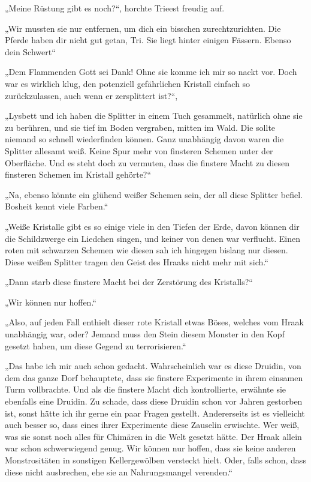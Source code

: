 „Meine Rüstung gibt es noch?“, horchte Trieest freudig auf.

„Wir mussten sie nur entfernen, um dich ein bisschen zurechtzurichten. Die Pferde haben dir nicht gut getan, Tri. Sie liegt hinter einigen Fässern. Ebenso dein Schwert“

„Dem Flammenden Gott sei Dank! Ohne sie komme ich mir so nackt vor. Doch war es wirklich klug, den potenziell gefährlichen Kristall einfach so zurückzulassen, auch wenn er zersplittert ist?“,

„Lysbett und ich haben die Splitter in einem Tuch gesammelt, natürlich ohne sie zu berühren, und sie tief im Boden vergraben, mitten im Wald. Die sollte niemand so schnell wiederfinden können. Ganz unabhängig davon waren die Splitter allesamt weiß. Keine Spur mehr von finsteren Schemen unter der Oberfläche. Und es steht doch zu vermuten, dass die finstere Macht zu diesen finsteren Schemen im Kristall gehörte?“

„Na, ebenso könnte ein glühend weißer Schemen sein, der all diese Splitter befiel. Bosheit kennt viele Farben.“

„Weiße Kristalle gibt es so einige viele in den Tiefen der Erde, davon können dir die Schildzwerge ein Liedchen singen, und keiner von denen war verflucht. Einen roten mit schwarzen Schemen wie diesen sah ich hingegen bislang nur diesen. Diese weißen Splitter tragen den Geist des Hraaks nicht mehr mit sich.“

„Dann starb diese finstere Macht bei der Zerstörung des Kristalls?“

„Wir können nur hoffen.“

„Also, auf jeden Fall enthielt dieser rote Kristall etwas Böses, welches vom Hraak unabhängig war, oder? Jemand muss den Stein diesem Monster in den Kopf gesetzt haben, um diese Gegend zu terrorisieren.“

„Das habe ich mir auch schon gedacht. Wahrscheinlich war es diese Druidin, von dem das ganze Dorf behauptete, dass sie finstere Experimente in ihrem einsamen Turm vollbrachte. Und als die finstere Macht dich kontrollierte, erwähnte sie ebenfalls eine Druidin. Zu schade, dass diese Druidin schon vor Jahren gestorben ist, sonst hätte ich ihr gerne ein paar Fragen gestellt. Andererseits ist es vielleicht auch besser so, dass eines ihrer Experimente diese Zauselin erwischte. Wer weiß, was sie sonst noch alles für Chimären in die Welt gesetzt hätte. Der Hraak allein war schon schwerwiegend genug. Wir können nur hoffen, dass sie keine anderen Monstrositäten in sonstigen Kellergewölben versteckt hielt. Oder, falls schon, dass diese nicht ausbrechen, ehe sie an Nahrungsmangel verenden.“


